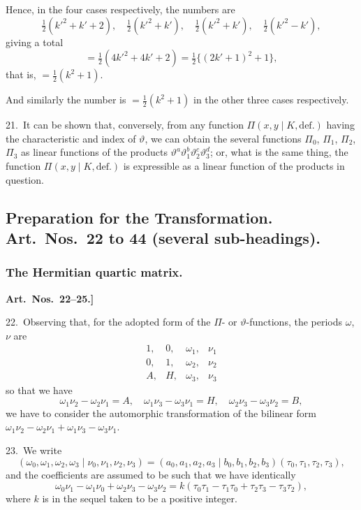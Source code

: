 \documentclass[11pt,a4paper]{book}
\begin{document}
Hence, in the four cases respectively, the numbers are
\[
\tfrac{1}{2}(k'^2 + k' + 2), \quad \tfrac{1}{2}(k'^2 + k'), \quad \tfrac{1}{2}(k'^2 + k'), \quad \tfrac{1}{2}(k'^2 - k'),
\]
giving a total
\[
= \tfrac{1}{2}(4k'^2 + 4k' + 2) = \tfrac{1}{2}\{(2k' + 1)^2 + 1\},
\]
that is, $= \frac{1}{2}(k^2 + 1)$.

And similarly the number is $= \frac{1}{2}(k^2 + 1)$ in the other three cases respectively.

\medskip

21.\ It can be shown that, conversely, from any function $\Pi(x, y \mid K, \text{def.})$ having the characteristic and index of $\vartheta$, we can obtain the several functions $\Pi_0$, $\Pi_1$, $\Pi_2$, $\Pi_3$ as linear functions of the products $\vartheta^a\vartheta_1^b\vartheta_2^c\vartheta_3^d$; or, what is the same thing, the function $\Pi(x, y \mid K, \text{def.})$ is expressible as a linear function of the products in question.

\newpage

\subsection*{Preparation for the Transformation. Art.~Nos.\ 22 to 44 (several sub-headings).}

\subsubsection*{The Hermitian quartic matrix.}

\textbf{Art.~Nos.~22--25.]
}

22.\ Observing that, for the adopted form of the $\Pi$- or $\vartheta$-functions, the periods $\omega$, $\nu$ are
\[
\begin{matrix}
1, & 0, & \omega_1, & \nu_1\\
0, & 1, & \omega_2, & \nu_2\\
A, & H, & \omega_3, & \nu_3
\end{matrix}
\]
so that we have
\[
\omega_1\nu_2 - \omega_2\nu_1 = A, \quad \omega_1\nu_3 - \omega_3\nu_1 = H, \quad \omega_2\nu_3 - \omega_3\nu_2 = B,
\]
we have to consider the automorphic transformation of the bilinear form $\omega_1\nu_2 - \omega_2\nu_1 + \omega_1\nu_3 - \omega_3\nu_1$.

\medskip

23.\ We write
\[
(\omega_0, \omega_1, \omega_2, \omega_3 \mid \nu_0, \nu_1, \nu_2, \nu_3) = (a_0, a_1, a_2, a_3 \mid b_0, b_1, b_2, b_3)(\tau_0, \tau_1, \tau_2, \tau_3),
\]
and the coefficients are assumed to be such that we have identically
\[
\omega_0\nu_1 - \omega_1\nu_0 + \omega_2\nu_3 - \omega_3\nu_2 = k(\tau_0\tau_1 - \tau_1\tau_0 + \tau_2\tau_3 - \tau_3\tau_2),
\]
where $k$ is in the sequel taken to be a positive integer.
\end{document}
